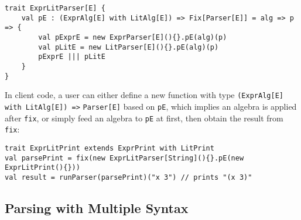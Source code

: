 \begin{lstlisting}
trait ExprLitParser[E] {
    val pE : (ExprAlg[E] with LitAlg[E]) => Fix[Parser[E]] = alg => p => {
        val pExprE = new ExprParser[E](){}.pE(alg)(p)
        val pLitE = new LitParser[E](){}.pE(alg)(p)
        pExprE ||| pLitE
    }
}
\end{lstlisting}

In client code, a user can either define a new function with type \lstinline{(ExprAlg[E] with LitAlg[E]) =>} \lstinline{Parser[E]} based on \lstinline{pE}, which implies an algebra is applied after \lstinline{fix}, or simply feed an algebra to \lstinline{pE} at first, then obtain the result from \lstinline{fix}:
\begin{lstlisting}
trait ExprLitPrint extends ExprPrint with LitPrint
val parsePrint = fix(new ExprLitParser[String](){}.pE(new ExprLitPrint(){}))
val result = runParser(parsePrint)("x 3") // prints "(x 3)"
\end{lstlisting}

\subsection{Parsing with Multiple Syntax}\label{subsec:differentsyntax}

